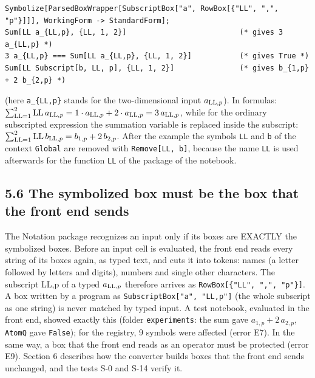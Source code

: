 \documentclass[
  10pt,
]{article}
\begin{document}
\begin{verbatim}
Symbolize[ParsedBoxWrapper[SubscriptBox["a", RowBox[{"LL", ",", "p"}]]], WorkingForm -> StandardForm];
Sum[LL a_{LL,p}, {LL, 1, 2}]                          (* gives 3 a_{LL,p} *)
3 a_{LL,p} === Sum[LL a_{LL,p}, {LL, 1, 2}]           (* gives True *)
Sum[LL Subscript[b, LL, p], {LL, 1, 2}]               (* gives b_{1,p} + 2 b_{2,p} *)
\end{verbatim}

(here \texttt{a\_\{LL,p\}} stands for the two-dimensional input
\(a_{{\rm LL},p}\)). In formulas:
\(\sum_{{\rm LL}=1}^{2}{\rm LL}\,a_{{\rm LL},p}=1\cdot a_{{\rm LL},p}+2\cdot a_{{\rm LL},p}=3\,a_{{\rm LL},p}\),
while for the ordinary subscripted expression the summation variable is
replaced inside the subscript:
\(\sum_{{\rm LL}=1}^{2}{\rm LL}\,b_{{\rm LL},p}=b_{1,p}+2\,b_{2,p}\).
After the example the symbols \texttt{LL} and \texttt{b} of the context
\texttt{Global\textasciigrave{}} are removed with
\texttt{Remove{[}LL,\ b{]}}, because the name \texttt{LL} is used
afterwards for the function \texttt{LL} of the package of the notebook.

\hypertarget{the-symbolized-box-must-be-the-box-that-the-front-end-sends}{%
\subsection{5.6 The symbolized box must be the box that the front end
sends}\label{the-symbolized-box-must-be-the-box-that-the-front-end-sends}}

The Notation package recognizes an input only if its boxes are EXACTLY
the symbolized boxes. Before an input cell is evaluated, the front end
reads every string of its boxes again, as typed text, and cuts it into
tokens: names (a letter followed by letters and digits), numbers and
single other characters. The subscript LL,p of a typed
\(a_{{\rm LL},p}\) therefore arrives as
\texttt{RowBox{[}\{"LL",\ ",",\ "p"\}{]}}. A box written by a program as
\texttt{SubscriptBox{[}"a",\ "LL,p"{]}} (the whole subscript as one
string) is never matched by typed input. A test notebook, evaluated in
the front end, showed exactly this (folder \texttt{experiments}: the sum
gave \(a_{1,p}+2\,a_{2,p}\), \texttt{AtomQ} gave \texttt{False}); for
the registry, 9 symbols were affected (error E7). In the same way, a box
that the front end reads as an operator must be protected (error E9).
Section 6 describes how the converter builds boxes that the front end
sends unchanged, and the tests S-0 and S-14 verify it.
\end{document}
